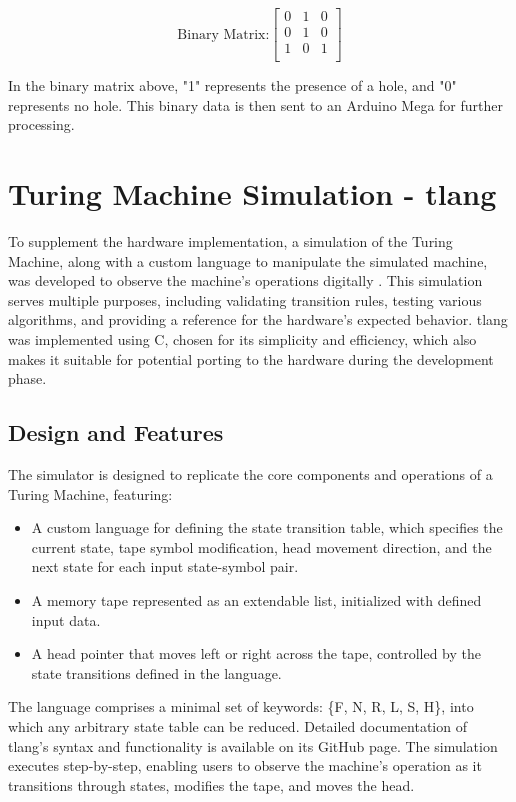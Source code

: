 \begin{example}
\[
\text{Binary Matrix:}
\begin{bmatrix}
0 & 1 & 0 \\
0 & 1 & 0 \\
1 & 0 & 1 \\
\end{bmatrix}
\]
\end{example}

In the binary matrix above, "1" represents the presence of a hole, and "0" represents no hole. This binary data is then sent to an Arduino Mega for further processing.

\section{Turing Machine Simulation - tlang}

To supplement the hardware implementation, a simulation of the Turing Machine, along with a custom language to manipulate the simulated machine, was developed to observe the machine's operations digitally \cite{tlang}. This simulation serves multiple purposes, including validating transition rules, testing various algorithms, and providing a reference for the hardware's expected behavior. tlang was implemented using C, chosen for its simplicity and efficiency, which also makes it suitable for potential porting to the hardware during the development phase.

\subsection{Design and Features}

The simulator is designed to replicate the core components and operations of a Turing Machine, featuring:
\begin{itemize}
    \item A custom language for defining the state transition table, which specifies the current state, tape symbol modification, head movement direction, and the next state for each input state-symbol pair.
    \item A memory tape represented as an extendable list, initialized with defined input data.
    \item A head pointer that moves left or right across the tape, controlled by the state transitions defined in the language.
\end{itemize}

The language comprises a minimal set of keywords: \{F, N, R, L, S, H\}, into which any arbitrary state table can be reduced. Detailed documentation of tlang's syntax and functionality is available on its GitHub page. The simulation executes step-by-step, enabling users to observe the machine's operation as it transitions through states, modifies the tape, and moves the head.


